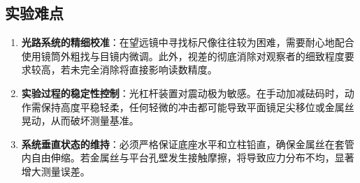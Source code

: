 \documentclass{../template/Report}%
\begin{document}
\subsection{实验难点}
\begin{enumerate}
    \item \textbf{光路系统的精细校准}：在望远镜中寻找标尺像往往较为困难，需要耐心地配合使用镜筒外粗找与目镜内微调。此外，视差的彻底消除对观察者的细致程度要求较高，若未完全消除将直接影响读数精度。
    \item \textbf{实验过程的稳定性控制}：光杠杆装置对震动极为敏感。在手动加减砝码时，动作需保持高度平稳轻柔，任何轻微的冲击都可能导致平面镜足尖移位或金属丝晃动，从而破坏测量基准。
    \item \textbf{系统垂直状态的维持}：必须严格保证底座水平和立柱铅直，确保金属丝在套管内自由伸缩。若金属丝与平台孔壁发生接触摩擦，将导致应力分布不均，显著增大测量误差。
\end{enumerate}
\end{document}
